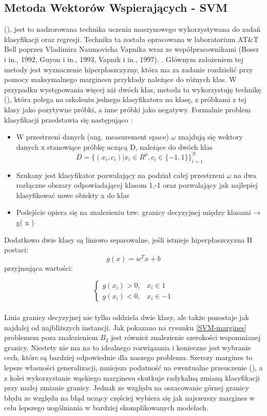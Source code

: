 \subsection{Metoda Wektorów Wspierających - SVM}
 (), jest to nadzorowana technika uczenia maszynowego wykorzystywana do zadań klasyfikacji oraz regresji. Technika ta została opracowana w laboratorium AT\&T Bell poprzez Vladimira Naumovicha Vapnika wraz ze współpracownikami (Boser i in., 1992, Guyon i in., 1993, Vapnik i in., 1997). \cite{Wiki:SVM}. Głównym założeniem tej metody jest wyznaczenie hiperpłaszczyzny, która ma za zadanie rozdzielić przy pomocy maksymalnego marginesu przykłady należące do różnych klas. W przypadku występowania więcej niż dwóch klas, metoda ta wykorzystuję technikę  (), która polega na szkoleniu jednego klasyfikatora na klasę, z próbkami z tej klasy jako pozytywne próbki, a inne próbki jako negatywy. Formalnie problem klasyfikacji przedstawia się następująco \cite{Prezentacja:SVM2}: 
\begin{itemize}
    \item W przestrzeni danych (ang. measurement space) $\omega$ znajdują się wektory danych x stanowiące próbkę uczącą D, należące do dwóch klas\\
    \begin{equation}
D = \big\{(x_{i}, c_{i}) | x_{i} \in R^{p}, c_{i} \in \{-1, 1\}\big\}_{i=1}^{N}
    \end{equation}
    \item Szukany jest klasyfikator pozwalający na podział całej przestrzeni $\omega$ na dwa rozłączne obszary odpowiadającej klasom {1,-1} oraz pozwalający jak najlepiej klasyfikować nowe obiekty x do klas
    \item Podejście opiera się na znalezieniu tzw. granicy decyzyjnej między klasami → g( x )
\end{itemize}
Dodatkowo dwie klasy są liniowo separowalne, jeśli istnieje hiperpłaszczyzna H postaci: \[g(x) = w^Tx + b\] przyjmująca wartości: 

\[
    \begin{cases}
            g(x_{i}) > 0,& x_{i} \in 1 \\
            g(x_{i}) < 0,& x_{i} \in -1
    \end{cases}
\]
\\

Linia granicy decyzyjnej nie tylko oddziela dwie klasy, ale także pozostaje jak najdalej od najbliższych instancji. Jak pokazano na rysunku \ref{SVM-margines} problemem poza znalezieniem $B_{2}$ jest również znalezienie szerokości wspomnianej granicy. Niestety nie ma na to idealnego rozwiązania i konieczne jest wybranie cech, które są bardziej odpowiednie dla naszego problemu. Szerszy margines to lepsze własności generalizacji, mniejsza podatność na
ewentualne przeuczenie (), a z kolei wykorzystanie wąskiego marginesu skutkuje radykalną zmianą klasyfikacji przy małej zmianie granicy. Jednak ze względu na oszacowanie górnej granicy błędu ze względu na błąd uczący częściej wybiera się jak najszerszy margines w celu lepszego uogólniania w bardziej skomplikowanych modelach.

